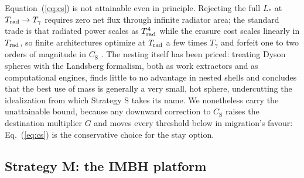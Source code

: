 \documentclass[11pt]{article}
\begin{document}
Equation~(\ref{eq:cs}) is not attainable even in principle. Rejecting the full $L_{*}$ at $T_{\rm rad} \to T_{\gamma}$ requires zero net flux through infinite radiator area; the standard trade is that radiated power scales as $T_{\rm rad}^{4}$ while the erasure cost scales linearly in $T_{\rm rad}$, so finite architectures optimize at $T_{\rm rad}$ a few times $T_{\gamma}$ and forfeit one to two orders of magnitude in $C_{\mathrm S}$ \citep{Sandberg2016,Bennett2019,Badescu2000}. The nesting itself has been priced: treating Dyson spheres with the Landsberg formalism, both as work extractors and as computational engines, \citet{Wright2023Landsberg} finds little to no advantage in nested shells and concludes that the best use of mass is generally a very small, hot sphere, undercutting the idealization from which Strategy S takes its name. We nonetheless carry the unattainable bound, because any downward correction to $C_{\mathrm S}$ raises the destination multiplier $G$ and moves every threshold below in migration's favour: Eq.~(\ref{eq:cs}) is the conservative choice for the stay option.

\subsection{Strategy M: the IMBH platform}
\end{document}
